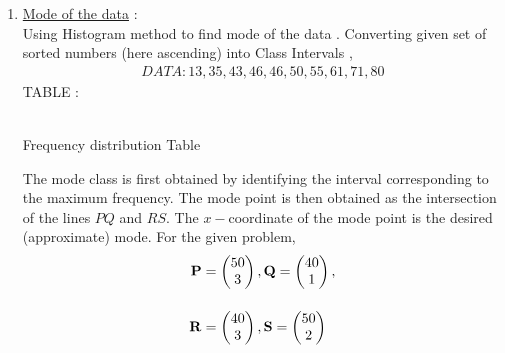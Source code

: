 \documentclass[journal,12pt,twocolumn]{IEEEtran}
\begin{document}
\begin{flushleft}
\begin{enumerate}
\item \underline{Mode of the data} :\\[6pt]
Using Histogram method to find mode of the data .
Converting given set of sorted numbers (here ascending) into Class Intervals ,\\[6pt]
	\begin{align}
		DATA : 13, 35, 43, 46, 46, 50, 55, 61, 71, 80
		\label{eq:3}	
	\end{align}
TABLE :
	\begin{table}[H]
			\def\arraystretch{1.5}    		
    		\centering
				\\[6pt]
    		\caption{Frequency distribution Table}
    			\label{Table 1}
	\end{table}
The mode class is first obtained by identifying the interval corresponding to the maximum frequency. The mode point is then obtained as the intersection of the lines $PQ$ and $RS$. The $x-$coordinate of the mode point is the desired (approximate) mode. For the
given problem,\\
	\begin{align}
		\mathbf{P} &= \begin{pmatrix}50 \\ 3\end{pmatrix},
		\mathbf{Q} = \begin{pmatrix}40 \\ 1\end{pmatrix},\\[12pt]
		\mathbf{R} &= \begin{pmatrix}40 \\ 3\end{pmatrix},
		\mathbf{S} = \begin{pmatrix}50 \\ 2\end{pmatrix}
 	\end{align} 


\end{enumerate}
\end{flushleft}
\end{document}

